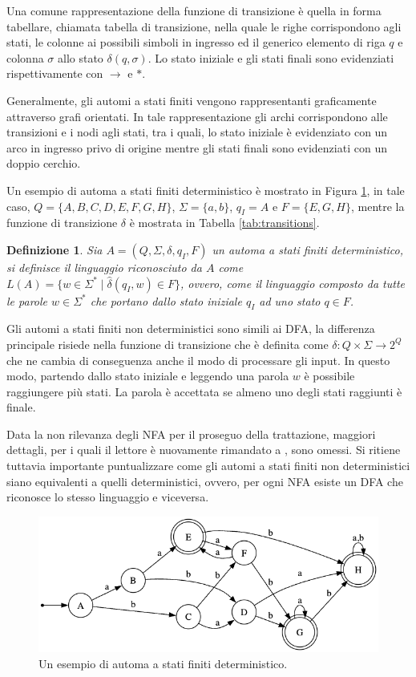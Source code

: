 \documentclass[a4paper,12pt]{report} %
\newtheorem{definition}{Definizione}[chapter] %
\begin{document}
Una comune rappresentazione della funzione di transizione è quella in forma tabellare, chiamata tabella di transizione,
nella quale le righe corrispondono agli stati, le colonne ai possibili simboli in ingresso ed il generico elemento
di riga $q$ e colonna $\sigma$ allo stato $\delta(q, \sigma)$. Lo stato iniziale e gli stati finali sono evidenziati
rispettivamente con $\rightarrow$ e $*$.

Generalmente, gli automi a stati finiti vengono rappresentanti graficamente attraverso grafi orientati.
In tale rappresentazione gli archi corrispondono alle transizioni e i nodi agli stati, tra i quali, lo stato iniziale è
evidenziato con un arco in ingresso privo di origine mentre gli stati finali sono evidenziati con un doppio cerchio.

Un esempio di automa a stati finiti deterministico è mostrato in Figura \ref{fig:dfa}, in tale caso,
$Q = \{A, B, C, D, E, F, G, H\}$, $\Sigma = \{a, b\}$, $q_I = A$ e $F = \{E, G, H\}$, mentre
la funzione di transizione $\delta$ è mostrata in Tabella \ref{tab:transitions}.

\begin{definition}
  \label{def:reg-lang}
  Sia $A = (Q, \Sigma, \delta, q_I, F)$ un automa a stati finiti deterministico, si definisce il \emph{linguaggio
  riconosciuto} da $A$ come $L(A) = \{w \in \Sigma^* \mid \hat{\delta}(q_I, w) \in F\}$, ovvero, come
  il linguaggio composto da tutte le parole $w \in \Sigma^*$ che portano dallo stato iniziale $q_I$ ad
  uno stato $q \in F$.
\end{definition}

Gli automi a stati finiti non deterministici sono simili ai DFA, la differenza principale risiede nella
funzione di transizione che è definita come $\delta: Q \times \Sigma \rightarrow 2^Q$ che ne cambia di
conseguenza anche il modo di processare gli input. In questo modo, partendo dallo stato iniziale e leggendo
una parola $w$ è possibile raggiungere più stati. La parola è accettata se almeno uno degli stati raggiunti è
finale.

Data la non rilevanza degli NFA per il proseguo della trattazione, maggiori dettagli, per i quali il lettore è
nuovamente rimandato a \parencite{HMU06}, sono omessi. Si ritiene tuttavia importante puntualizzare come gli automi
a stati finiti non deterministici siano equivalenti a quelli deterministici, ovvero, per ogni NFA esiste un
DFA che riconosce lo stesso linguaggio e viceversa.

\begin{figure}[!htb]
  \centering
  \includegraphics[width=0.7\linewidth]{images/dfa.png}
  \caption{\label{fig:dfa}Un esempio di automa a stati finiti deterministico.}
\end{figure}
\end{document}
